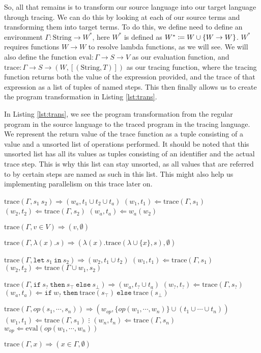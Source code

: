     So, all that remains is to transform our source language into our target language through tracing.
    We can do this by looking at each of our source terms and transforming them into target terms.
    To do this, we define need to define an environment ${\Gamma:\text{String}\to W^*}$, here ${W^*}$ is defined as ${W^*\coloneqq W\cup\{W\to W\}}$.
    ${W^*}$ requires functions ${W\to W}$ to resolve lambda functions, as we will see.
    We will also define the function ${\text{eval}:\Gamma\to S\to V}$ as our evaluation function, and ${\text{trace}:\Gamma\to S\to (W,[(\text{String},T)])}$ as our tracing function, where the tracing function returns both the value of the expression provided, and the trace of that expression as a list of tuples of named steps.
    This then finally allows us to create the program transformation in Listing \ref{lst:trans}.

    In Listing \ref{lst:trans}, we see the program transformation from the regular program in the source language to the traced program in the tracing language.
    We represent the return value of the trace function as a tuple consisting of a value and a unsorted list of operations performed.
    It should be noted that this unsorted list has all its values as tuples consisting of an identifier and the actual trace step.
    This is why this list can stay unsorted, as all values that are referred to by certain steps are named as such in this list.
    This might also help us implementing parallelism on this trace later on.

    \begin{deflisting}[caption=Tracing transformation,label=lst:trans,gobble=8]
        $\text{trace}(\Gamma,s_1\ s_2)\Rightarrow(w_a, t_1\cup t_2\cup t_a)$
            $(w_1,t_1)\Leftarrow\text{trace}(\Gamma,s_1)$
            $(w_2,t_2)\Leftarrow\text{trace}(\Gamma,s_2)$
            $(w_a,t_a)\Leftarrow w_a(w_2)$

        $\text{trace}(\Gamma, v\in V)\Rightarrow(v,\emptyset)$

        $\text{trace}(\Gamma, \lambda(x).s)\Rightarrow(\lambda(x).\text{trace}(\lambda\cup\{x\}, s),\emptyset)$

        $\text{trace}(\Gamma, \texttt{let}\ s_1\ \texttt{in}\ s_2)\Rightarrow(w_2,t_1\cup t_2)$
            $(w_1,t_1)\Leftarrow\text{trace}(\Gamma,s_1)$
            $(w_2,t_2)\Leftarrow\text{trace}(\Gamma\cup w_1,s_2)$

        $\text{trace}(\Gamma, \texttt{if}\ s_?\ \texttt{then}\ s_\top\ \texttt{else}\ s_\bot)\Rightarrow(w_a,t_?\cup t_a)$
            $(w_?,t_?)\Leftarrow\text{trace}(\Gamma,s_?)$
            $(w_a,t_a)\Leftarrow\texttt{if}\ w_?\ \texttt{then}\ \text{trace}(s_\top)\ \texttt{else}\ \text{trace}(s_\bot)$
        
        $\text{trace}(\Gamma, op(s_1,\dotsb,s_n))\Rightarrow(w_{op},\{op(w_1,\dotsb,w_n)\}\cup(t_1\cup\dotsb\cup t_n))$
            $(w_1,t_1)\Leftarrow\text{trace}(\Gamma, s_1)$
                $\vdots$
            $(w_n,t_n)\Leftarrow\text{trace}(\Gamma, s_n)$
            $w_{op}\Leftarrow\text{eval}(op(w_1,\dotsb,w_n))$

        $\text{trace}(\Gamma, x)\Rightarrow(x\in\Gamma,\emptyset)$
    \end{deflisting}
